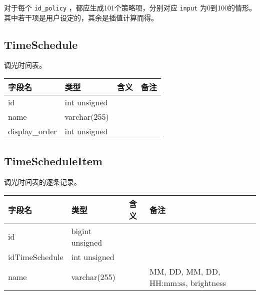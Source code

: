 对于每个 \texttt{id\_policy} ，都应生成101个策略项，分别对应
\texttt{input}
为0到100的情形。其中若干项是用户设定的，其余是插值计算而得。

\subsection{TimeSchedule}\label{timeschedule}

调光时间表。

\begin{longtabu}[c]{@{}lXXX@{}}
\toprule
字段名 & 类型 & 含义 & 备注\tabularnewline
\midrule
\endhead
id & int unsigned & &\tabularnewline
name & varchar(255) & &\tabularnewline
display\_order & int unsigned & &\tabularnewline
\bottomrule
\end{longtabu}

\subsection{TimeScheduleItem}\label{timescheduleitem}

调光时间表的逐条记录。

\begin{longtabu}[c]{@{}lXXX@{}}
\toprule
字段名 & 类型 & 含义 & 备注\tabularnewline
\midrule
\endhead
id & bigint unsigned & &\tabularnewline
idTimeSchedule & int unsigned & &\tabularnewline
name & varchar(255) & & MM, DD, MM, DD, HH:mm:ss,
brightness\tabularnewline
\bottomrule
\end{longtabu}
